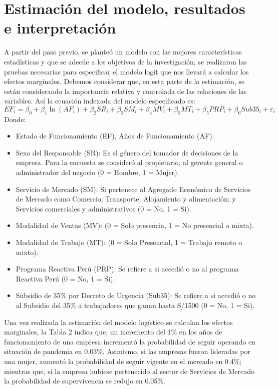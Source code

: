 \documentclass[12pt]{article}
\begin{document}
        \section{Estimación del modelo, resultados e interpretación}
        A partir del paso previo, se planteó un modelo con las mejores características estadísticas y que se adecúe a los objetivos
        de la investigación, se realizaron las pruebas necesarias para especificar el modelo logit que nos llevará a calcular
        los efectos marginales. Debemos considerar que, en esta parte de la estimación, se están considerando la importancia
        relativa y controlada de las relaciones de las variables. Así la ecuación indexada del modelo especificado es:
            \begin{equation}
                EF_{i} = \beta_{0} + \beta_{1}\ln{\left(AF_{i}\right)} + \beta_{2}SR_{i} + \beta_{3}SM_{i} + \beta_{4}MV_{i} + \beta_{5}MT_{i} + \beta_{5}PRP_{i} + \beta_{6}Sub35_{i} + \varepsilon_{i}
            \end{equation}
        Donde:
            \begin{itemize}
                \item Estado de Funcionamiento (EF), Años de Funcionamiento (AF).
                \item Sexo del Responsable (SR): Es el género del tomador de decisiones de la empresa. Para la encuesta se consideró al propietario, al gerente general o administrador del negocio (0 = Hombre, 1 = Mujer).
                \item Servicio de Mercado (SM): Si pertenece al Agregado Económico de Servicios de Mercado como Comercio; Transporte; Alojamiento y alimentación; y Servicios comerciales y administrativos (0 = No, 1 = Si).
                \item Modalidad de Ventas (MV): (0 = Solo presencia, 1 = No presencial o mixta).
                \item Modalidad de Trabajo (MT): (0 = Solo Presencial, 1 = Trabajo remoto o mixto).
                \item Programa Reactiva Perú (PRP): Se refiere a si accedió o no al programa Reactiva Perú (0 = No, 1 = Si).
                \item Subsidio de 35\% por Decreto de Urgencia (Sub35): Se refiere a si accedió o no al Subsidio del 35\% a trabajadores que ganan hasta S/1500 (0 = No, 1 = Si).
            \end{itemize}
        Una vez realizada la estimación del modelo logístico se calculan los efectos marginales, la Tabla 2 indica que,
        un incremento del 1\% en los años de funcionamiento de una empresa incrementó la probabilidad de seguir operando
        en situación de pandemia en 0.03\%. Asimismo, si las empresas fueron lideradas por una mujer, aumentó la probabilidad
        de seguir vigente en el mercado en 0.4\%; mientras que, si la empresa hubiese pertenecido al sector de Servicios
        de Mercado la probabilidad de supervivencia se redujo en 0.05\%.
\end{document}
